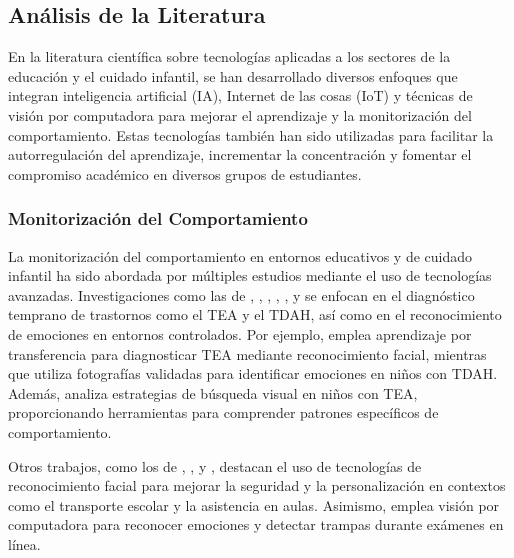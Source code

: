 \documentclass[a4paper,fleqn]{cas-sc}
\begin{document}
	
	\subsection{Análisis de la Literatura}
	
	En la literatura científica sobre tecnologías aplicadas a los sectores de la educación y el cuidado infantil, se han desarrollado diversos enfoques que integran inteligencia artificial (IA), Internet de las cosas (IoT) y técnicas de visión por computadora para mejorar el aprendizaje y la monitorización del comportamiento. Estas tecnologías también han sido utilizadas para facilitar la autorregulación del aprendizaje, incrementar la concentración y fomentar el compromiso académico en diversos grupos de estudiantes.
	
	\subsubsection{Monitorización del Comportamiento}
	
	La monitorización del comportamiento en entornos educativos y de cuidado infantil ha sido abordada por múltiples estudios mediante el uso de tecnologías avanzadas. Investigaciones como las de \cite{Akter2021}, \cite{Albrecht2014}, \cite{Berrezueta-Guzman2021}, \cite{Pelc2006}, \cite{VilliersRader2021}, \cite{Warren2015Brief} y \cite{Washington2016AWereable} se enfocan en el diagnóstico temprano de trastornos como el TEA y el TDAH, así como en el reconocimiento de emociones en entornos controlados. Por ejemplo, \cite{Akter2021} emplea aprendizaje por transferencia para diagnosticar TEA mediante reconocimiento facial, mientras que \cite{Pelc2006} utiliza fotografías validadas para identificar emociones en niños con TDAH. Además, \cite{Albrecht2014} analiza estrategias de búsqueda visual en niños con TEA, proporcionando herramientas para comprender patrones específicos de comportamiento.
	
	Otros trabajos, como los de \cite{Boumiza2017}, \cite{DaCosta2023}, \cite{Hachad2020} y \cite{James2019}, destacan el uso de tecnologías de reconocimiento facial para mejorar la seguridad y la personalización en contextos como el transporte escolar y la asistencia en aulas. Asimismo, \cite{Ozdamli2022} emplea visión por computadora para reconocer emociones y detectar trampas durante exámenes en línea.
	
\end{document}
